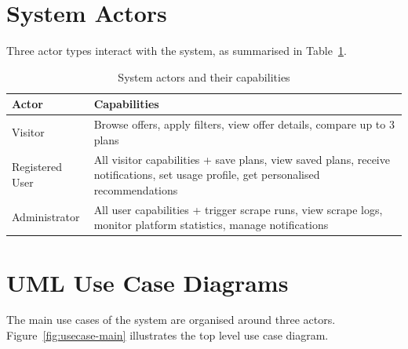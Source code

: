 \section{System Actors}

Three actor types interact with the system, as summarised in Table~\ref{tab:actors}.

\begin{table}[H]
  \caption{System actors and their capabilities}
  \label{tab:actors}
  \centering\small
  \begin{tabular}{|p{3.5cm}|p{11.5cm}|}
    \hline
    \textbf{Actor}  & \textbf{Capabilities} \\
    \hline
    Visitor         & Browse offers, apply filters, view offer details, compare up to 3 plans \\
    \hline
    Registered User & All visitor capabilities + save plans, view saved plans, receive notifications, set usage profile, get personalised recommendations \\
    \hline
    Administrator   & All user capabilities + trigger scrape runs, view scrape logs, monitor platform statistics, manage notifications \\
    \hline
  \end{tabular}
\end{table}

\section{UML Use Case Diagrams}

The main use cases of the system are organised around three actors. Figure~\ref{fig:usecase-main} illustrates the top level use case diagram.

